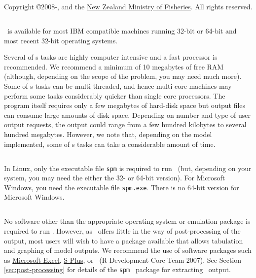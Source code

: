 Copyright \copyright 2008-\SourceControlYearDoc, \href{http://www.niwa.co.nz}{\Organisation} and the \href{http://www.fish.govt.nz}{New Zealand Ministry of Fisheries}. All rights reserved.

\subsection{}

\SPM\ is available for most IBM compatible machines running 32-bit or 64-bit  and most recent 32-bit  operating systems.

Several of \SPM s tasks are highly computer intensive and a fast processor is recommended. We recommend a minimum of 10 megabytes of free RAM (although, depending on the scope of the problem, you may need much more). Some of \SPM s tasks can be multi-threaded, and hence multi-core machines may perform some tasks considerably quicker than single core processors. The program itself requires only a few megabytes of hard-disk space but output files can consume large amounts of disk space. Depending on number and type of user output requests, the output could range from a few hundred kilobytes to several hundred megabytes. However, we note that, depending on the model implemented, some of \SPM s tasks can take a considerable amount of time.

\subsection{}

In Linux, only the executable file \texttt{spm} is required to run \SPM\ (but, depending on your system, you may need the either the 32- or 64-bit version). For Microsoft Windows, you need the executable file \texttt{spm.exe}. There is no 64-bit version for Microsoft Windows.

\subsection{}

No software other than the appropriate operating system or emulation package is required to run \SPM. However, as \SPM\ offers little in the way of  post-processing of the output, most users will wish to have a package available that allows tabulation and graphing of model outputs. We recommend the use of software packages such as \href{http://www.microsoft.com}{Microsoft Excel}, \href{http://www.insightful.com}{S-Plus}, or \href{http://www.r-project.org}{\R}\ (R Development Core Team 2007). See Section \ref{sec:post-processing} for details of the \texttt{spm} \R\ package for extracting \SPM\ output.


